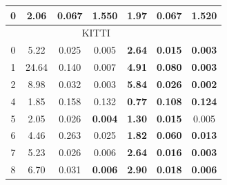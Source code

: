 \documentclass[10pt,twocolumn,letterpaper]{article}
\begin{document}
\begin{table}[htbp]
\begin{tabular}{|ccccccc|}
\multicolumn{1}{|c|}{0}          & \multicolumn{1}{c|}{2.06}        & \multicolumn{1}{c|}{\textbf{0.067}}   & \multicolumn{1}{c|}{1.550}                & \multicolumn{1}{c|}{\textbf{1.97}}  & \multicolumn{1}{c|}{\textbf{0.067}} & \textbf{1.520}              \\ \hline
\multicolumn{6}{|c|}{KITTI}           &                                            \\ \hline
\multicolumn{1}{|c|}{0}          & \multicolumn{1}{c|}{5.22}        & \multicolumn{1}{c|}{0.025}            & \multicolumn{1}{c|}{0.005}                & \multicolumn{1}{c|}{\textbf{2.64}}  & \multicolumn{1}{c|}{\textbf{0.015}} & \textbf{0.003}              \\ \hline
\multicolumn{1}{|c|}{1}          & \multicolumn{1}{c|}{24.64}       & \multicolumn{1}{c|}{0.140}            & \multicolumn{1}{c|}{0.007}                & \multicolumn{1}{c|}{\textbf{4.91}}  & \multicolumn{1}{c|}{\textbf{0.080}} & \textbf{0.003}              \\ \hline
\multicolumn{1}{|c|}{2}          & \multicolumn{1}{c|}{8.98}        & \multicolumn{1}{c|}{0.032}            & \multicolumn{1}{c|}{0.003}                & \multicolumn{1}{c|}{\textbf{5.84}}  & \multicolumn{1}{c|}{\textbf{0.026}} & \textbf{0.002}              \\ \hline
\multicolumn{1}{|c|}{4}          & \multicolumn{1}{c|}{1.85}        & \multicolumn{1}{c|}{0.158}            & \multicolumn{1}{c|}{0.132}                & \multicolumn{1}{c|}{\textbf{0.77}}  & \multicolumn{1}{c|}{\textbf{0.108}} & \textbf{0.124}              \\ \hline
\multicolumn{1}{|c|}{5}          & \multicolumn{1}{c|}{2.05}        & \multicolumn{1}{c|}{0.026}            & \multicolumn{1}{c|}{\textbf{0.004}}       & \multicolumn{1}{c|}{\textbf{1.30}}  & \multicolumn{1}{c|}{\textbf{0.015}} & 0.005                       \\ \hline
\multicolumn{1}{|c|}{6}          & \multicolumn{1}{c|}{4.46}        & \multicolumn{1}{c|}{0.263}            & \multicolumn{1}{c|}{0.025}       & \multicolumn{1}{c|}{\textbf{1.82}}  & \multicolumn{1}{c|}{\textbf{0.060}} & \textbf{0.013}                       \\ \hline
\multicolumn{1}{|c|}{7}          & \multicolumn{1}{c|}{5.23}        & \multicolumn{1}{c|}{0.026}            & \multicolumn{1}{c|}{0.006}                & \multicolumn{1}{c|}{\textbf{2.64}}  & \multicolumn{1}{c|}{\textbf{0.016}} & \textbf{0.003}              \\ \hline
\multicolumn{1}{|c|}{8}          & \multicolumn{1}{c|}{6.70}        & \multicolumn{1}{c|}{0.031}            & \multicolumn{1}{c|}{\textbf{0.006}}       & \multicolumn{1}{c|}{\textbf{2.90}}  & \multicolumn{1}{c|}{\textbf{0.018}} & \textbf{0.006}              \\ \hline

\end{tabular}
\end{table}
\end{document}

